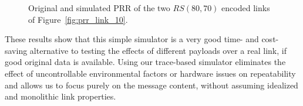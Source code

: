 \begin{figure}[t]
	\caption{Original and simulated \acs{PRR} of the two $RS(80,70)$ encoded links of Figure~\ref{fig:prr_link_10}.}
	\label{fig:prr_link_10_fec}
\end{figure}

These results show that this simple simulator is a very good time- and cost-saving alternative to testing the effects of different payloads over a real link, if good original data is available.
Using our trace-based simulator eliminates the effect of uncontrollable environmental factors or hardware issues on repeatability and allows us to focus purely on the message content, without assuming  idealized and monolithic link properties.
